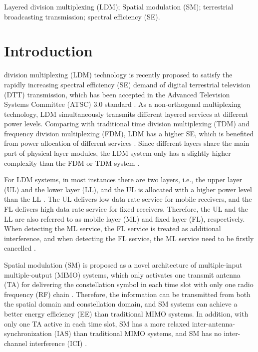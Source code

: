\documentclass[journal]{IEEEtran}
\begin{document}
\begin{IEEEkeywords}
Layered division multiplexing (LDM); Spatial modulation (SM); terrestrial broadcasting transmission; spectral efficiency (SE).
\end{IEEEkeywords}

\IEEEpeerreviewmaketitle

\section{Introduction}

 division multiplexing (LDM) technology is recently proposed to satisfy the rapidly increasing spectral efficiency (SE) demand of digital terrestrial television (DTT) transmission, which has been accepted in the Advanced Television Systems Committee (ATSC) 3.0 standard \cite{ATSC, ATSC_MIMO, LDM_ATSC, LDM_TAP, LDM_MIMO_C, LDM_BMSB}. As a non-orthogonal multiplexing technology, LDM simultaneously transmits different layered services at different power levels. Comparing with traditional time division multiplexing (TDM) and frequency division multiplexing (FDM), LDM has a higher SE, which is benefited from power allocation of different services \cite{LDM_MIMO_C}. Since different layers share the main part of physical layer modules, the LDM system only has a slightly higher complexity than the FDM or TDM system \cite{LDM_ATSC}.

For LDM systems, in most instances there are two layers, i.e., the upper layer (UL) and the lower layer (LL), and the UL is allocated with a higher power level than the LL \cite{LDM_TAP}. The UL delivers low data rate service for mobile receivers, and the FL delivers high data rate service for fixed receivers. Therefore, the UL and the LL are also referred to as mobile layer (ML) and fixed layer (FL), respectively. When detecting the ML service, the FL service is treated as additional interference, and when detecting the FL service, the ML service need to be firstly cancelled \cite{LDM_BMSB}.

Spatial modulation (SM) is proposed as a novel architecture of multiple-input multiple-output (MIMO) systems, which only activates one transmit antenna (TA) for delivering the constellation symbol in each time slot with only one radio frequency (RF) chain \cite{SM} \cite{SM_mgz}. Therefore, the information can be transmitted from both the spatial domain and constellation domain, and SM systems can achieve a better energy efficiency (EE) than traditional MIMO systems. In addition, with only one TA active in each time slot, SM has a more relaxed inter-antenna-synchronization (IAS) than traditional MIMO systems, and SM has no inter-channel interference (ICI) \cite{SM_mgz}.
\end{document}
